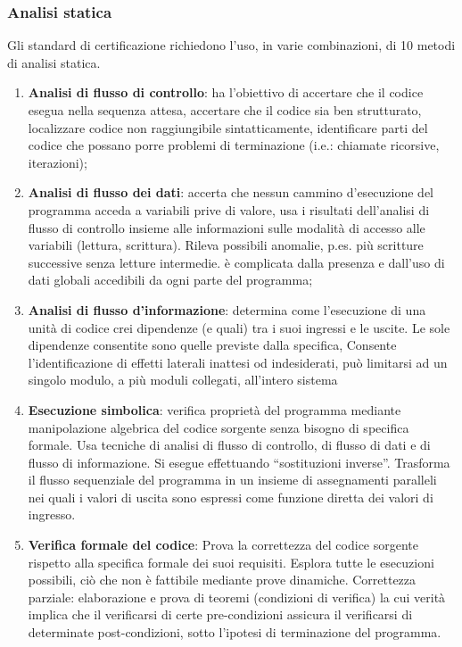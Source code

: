 \subsubsection{Analisi statica}
Gli standard di certificazione richiedono l'uso, in varie combinazioni, di 10 metodi di analisi statica.
\begin{enumerate}
\item \textbf{Analisi di flusso di controllo}: ha l'obiettivo di accertare che il codice esegua nella sequenza attesa, accertare che il codice sia ben strutturato, localizzare codice non raggiungibile sintatticamente, identificare parti del codice che possano porre problemi di terminazione (i.e.: chiamate ricorsive, iterazioni);
\item \textbf{Analisi di flusso dei dati}: accerta che nessun cammino d'esecuzione del programma acceda a variabili prive di valore, usa i risultati dell'analisi di flusso di controllo insieme alle informazioni sulle modalità di accesso alle variabili (lettura, scrittura). Rileva possibili anomalie, p.es. più scritture successive senza letture intermedie. è complicata dalla presenza e dall'uso di dati globali accedibili da ogni parte del programma;
\item \textbf{Analisi di flusso d'informazione}: determina come l'esecuzione di una unità di codice crei dipendenze (e quali) tra i suoi ingressi e le uscite. Le sole dipendenze consentite sono quelle previste dalla specifica, Consente l'identificazione di effetti laterali inattesi od indesiderati, può limitarsi ad un singolo modulo, a più moduli collegati, all'intero sistema
\item \textbf{Esecuzione simbolica}: verifica proprietà del programma mediante manipolazione algebrica del codice sorgente senza bisogno di specifica formale. Usa tecniche di analisi di flusso di controllo, di flusso di dati e di flusso di informazione. Si esegue effettuando ``sostituzioni inverse''. Trasforma il flusso sequenziale del programma in un insieme di assegnamenti paralleli nei quali i valori di uscita sono espressi come funzione diretta dei valori di ingresso.
\item \textbf{Verifica formale del codice}: Prova la correttezza del codice sorgente rispetto alla specifica formale dei suoi requisiti. Esplora tutte le esecuzioni possibili, ciò che non è fattibile mediante prove dinamiche. Correttezza parziale: elaborazione e prova di teoremi (condizioni di verifica) la cui verità implica che il verificarsi di certe pre-condizioni assicura il verificarsi di determinate post-condizioni, sotto l'ipotesi di terminazione del programma.

\end{enumerate}
